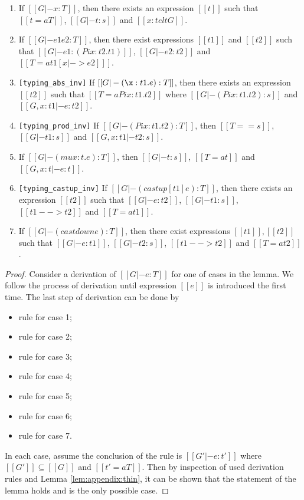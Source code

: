 \begin{lemma}\label{lem:appendix:gen}
\begin{enumerate}[(1)]
	\item If $[[G |- x:T]]$, then there exists an expression $[[t]]$ such that $[[t
=a T]]$, $[[G |- t:s]]$ and $[[x:t elt G]]$.
	\item If $[[G |- e1 e2:T]]$, then there exist expressions $[[t1]]$ and
$[[t2]]$ such that $[[G |- e1 : (Pi x:t2.t1)]]$, $[[G |- e2:t2]]$ and $[[T =a
t1[x |-> e2] ]]$.
	\item \verb|[typing_abs_inv]| If $[[G |- (\x:t1.e):T]]$, then there exists an expression $[[t2]]$ such
that $[[T =a Pi x:t1.t2]]$ where $[[G |- (Pi x:t1.t2):s]]$ and $[[G,x:t1 |-
e:t2]]$.
    \item \verb|[typing_prod_inv]| If $[[G |- (Pi x:t1.t2):T]]$, then $[[T == s]]$, $[[G |- t1:s]]$ and
$[[G, x:t1 |- t2:s]]$.
	\item If $[[G |- (mu x:t.e):T]]$, then $[[G |- t:s]]$, $[[T =a t]]$ and $[[G,
x:t|-e:t]]$.
	\item \verb|[typing_castup_inv]| If $[[G |- (castup [t1] e):T]]$, then there exists an expression $[[t2]]$
such that $[[G |- e:t2]]$, $[[G |- t1:s]]$, $[[t1 --> t2]]$ and $[[T =a t1]]$.
	\item If $[[G |- (castdown e):T]]$, then there exist expressions
$[[t1]],[[t2]]$ such that $[[G |- e:t1]]$, $[[G |- t2:s]]$, $[[t1 --> t2]]$ and
$[[T =a t2]]$.
\end{enumerate}
\end{lemma}

\begin{proof}
    Consider a derivation of $[[G |- e:T]]$ for one of cases in the lemma. We
follow the process of derivation until expression $[[e]]$ is introduced the
first time. The last step of derivation can be done by
    \begin{itemize}
        \item rule  for case 1;
        \item rule  for case 2;
        \item rule  for case 3;
        \item rule  for case 4;
        \item rule  for case 5;
        \item rule  for case 6;
        \item rule  for case 7.
    \end{itemize}
    In each case, assume the conclusion of the rule is $[[G' |- e : t']]$ where
$[[G']] \subseteq [[G]]$ and $[[t' =a T]]$. Then by inspection of used
derivation rules and Lemma \ref{lem:appendix:thin}, it can be shown that the
statement of the lemma holds and is the only possible case.
\end{proof}

